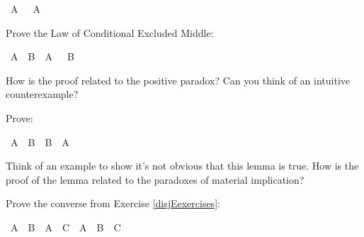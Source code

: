 \begin{isabellebody}
\ {\isachardoublequoteopen}A\ {\isasymor}\ {\isasymnot}\ A{\isachardoublequoteclose}\isacommand{{\isachardot}{\isachardot}}\isamarkupfalse%
\isanewline
{}\isamarkupfalse%
%
\endisatagproof
{\isafoldproof}%
%
\isadelimproof
%
\endisadelimproof
%
\begin{isamarkuptext}%
\begin{Exercise}[title = Conditional Excluded Middle] Prove the Law of Conditional Excluded
Middle: \end{Exercise}%
\end{isamarkuptext}\isamarkuptrue%
\isamarkupfalse%
\ {\isachardoublequoteopen}{\isacharparenleft}A\ {\isasymlongrightarrow}\ B{\isacharparenright}\ {\isasymor}\ {\isacharparenleft}A\ {\isasymlongrightarrow}\ {\isasymnot}\ B{\isacharparenright}{\isachardoublequoteclose}%
\isadelimproof
\ %
\endisadelimproof
%
\isatagproof
{}\isamarkupfalse%
%
\endisatagproof
{\isafoldproof}%
%
\isadelimproof
%
\endisadelimproof
%
\begin{isamarkuptext}%
How is the proof related to the positive paradox? Can you think of an intuitive counterexample?%
\end{isamarkuptext}\isamarkuptrue%
%
\begin{isamarkuptext}%
\begin{Exercise} Prove: \end{Exercise}%
\end{isamarkuptext}\isamarkuptrue%
\isamarkupfalse%
\ {\isachardoublequoteopen}{\isacharparenleft}A\ {\isasymlongrightarrow}\ B{\isacharparenright}\ {\isasymor}\ {\isacharparenleft}B\ {\isasymlongrightarrow}\ A{\isacharparenright}{\isachardoublequoteclose}%
\isadelimproof
\ %
\endisadelimproof
%
\isatagproof
{}\isamarkupfalse%
%
\endisatagproof
{\isafoldproof}%
%
\isadelimproof
%
\endisadelimproof
%
\begin{isamarkuptext}%
Think of an example to show it's not obvious that this lemma is true. How is the proof of
the lemma related to the paradoxes of material implication?%
\end{isamarkuptext}\isamarkuptrue%
%
\begin{isamarkuptext}%
\begin{Exercise}  Prove the converse from Exercise \ref{disjEexercises}: \end{Exercise}%
\end{isamarkuptext}\isamarkuptrue%
\isamarkupfalse%
\ {\isachardoublequoteopen}{\isacharparenleft}A\ {\isasymor}\ B{\isacharparenright}\ {\isasymand}\ {\isacharparenleft}A\ {\isasymor}\ C{\isacharparenright}\ {\isasymlongrightarrow}\ A\ {\isasymor}\ B\ {\isasymand}\ C{\isachardoublequoteclose}%

\end{isabellebody}
